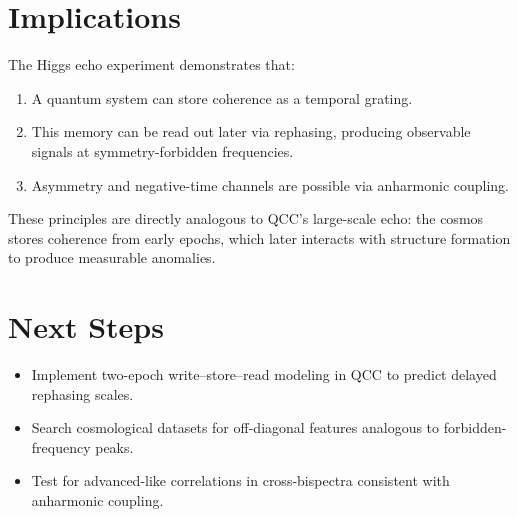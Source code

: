 \documentclass[12pt]{article}
\begin{document}
\section{Implications}
The Higgs echo experiment demonstrates that:
\begin{enumerate}
    \item A quantum system can store coherence as a temporal grating.
    \item This memory can be read out later via rephasing, producing observable signals at symmetry-forbidden frequencies.
    \item Asymmetry and negative-time channels are possible via anharmonic coupling.
\end{enumerate}
These principles are directly analogous to QCC's large-scale echo: the cosmos stores coherence from early epochs, which later interacts with structure formation to produce measurable anomalies.

\section{Next Steps}
\begin{itemize}
    \item Implement two-epoch write--store--read modeling in QCC to predict delayed rephasing scales.
    \item Search cosmological datasets for off-diagonal features analogous to forbidden-frequency peaks.
    \item Test for advanced-like correlations in cross-bispectra consistent with anharmonic coupling.
\end{itemize}
\end{document}
